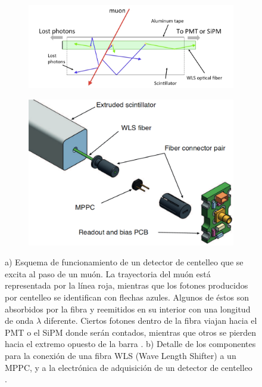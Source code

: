 \documentclass[12pt,oneside,openany,letter]{book}
\begin{document}
\begin{figure}[h!]
\begin{center}

\begin{subfigure}{0.7\textwidth}
\includegraphics[width=\textwidth]{images/fibra.jpg}
\caption{}
\label{fibra}
\end{subfigure}

\begin{subfigure}{0.55\textwidth}
\includegraphics[width=\textwidth]{scintillator_scheme.png}
\caption{}
\label{scintillator_scheme}
\end{subfigure}
\end{center}

\caption[Esquema de funcionamiento de un detector de centelleo]{a) Esquema de funcionamiento de un detector de centelleo que se excita al paso de un muón. La trayectoria del muón está representada por la línea roja, mientras que los fotones producidos por centelleo se identifican con flechas azules. Algunos de \'estos son absorbidos por la fibra y reemitidos en su interior con una longitud de onda $\lambda$ diferente. Ciertos fotones dentro de la fibra viajan hacia el PMT o el SiPM donde serán contados, mientras que otros se pierden hacia el extremo opuesto de la barra \cite{amiga-etal2016}. b) Detalle de los componentes para la conexión de una fibra WLS (Wave Length Shifter) a un MPPC, y a la electrónica de adquisición de un detector de centelleo \cite{soter2014segmented}.}
  \label{scintillator_general}
\end{figure}
\end{document}
